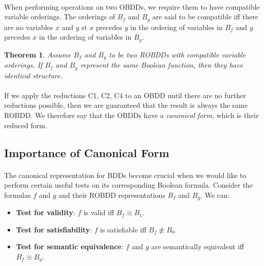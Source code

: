 \documentclass{article}
\theoremstyle{plain}
\newtheorem{thm}{Theorem}[section]
\theoremstyle{definition}
\begin{document}
\begin{multicols}{2}
\paragraph{} When performing operations on two OBDDs, we require them to have compatible variable orderings. The orderings of $B_f$ and $B_y$ are said to be compatible iff there are no variables $x$ and $y$ st $x$ precedes $y$ in the ordering of variables in $B_f$ and $y$ precedes $x$ in the ordering of variables in $B_y$.

\begin{thm}
Assume $B_f$ and $B_y$ to be two ROBDDs with compatible variable orderings. If $B_f$ and $B_y$ represent the same Boolean function, then they have identical structure.
\end{thm}

\paragraph{} If we apply the reductions C1, C2, C4 to an OBDD until there are no further reductions possible, then we are guaranteed that the result is always the same ROBDD. We therefore say that the OBDDs have a \textit{canonical form}, which is their reduced form.

\subsection{Importance of Canonical Form}

\paragraph{} The canonical representation for BDDs become crucial when we would like to perform certain useful tests on its corresponding Boolean formula. Consider the formulas $f$ and $g$ and their ROBDD representations $B_f$ and $B_g$. We can:

\begin{itemize}
\item \textbf{Test for validity}: $f$ is valid iff $B_f \equiv B_1$.
\item \textbf{Test for satisfiability}: $f$ is satisfiable iff $B_f \not\equiv B_0$.
\item \textbf{Test for semantic equivalence}: $f$ and $g$ are semantically equivalent iff $B_f \equiv B_y$.
\end{itemize}

\end{multicols}
\end{document}
